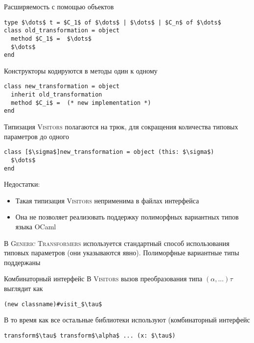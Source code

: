 \documentclass[
  russian,
  aspectratio=43,
  xcolor={svgnames},
  hyperref={colorlinks,citecolor=DeepPink4,linkcolor=DarkRed,urlcolor=DarkBlue}]{beamer}
\begin{document}
\begin{frame}[fragile]{Расширяемость с помощью объектов}
\begin{lstlisting}[style=ocaml1]
type $\dots$ t = $C_1$ of $\dots$ | $\dots$ | $C_n$ of $\dots$
class old_transformation = object 
  method $C_1$ =  $\dots$
  $\dots$
end
\end{lstlisting}
Конструкторы кодируются в методы один к одному
\begin{lstlisting}[style=ocaml1]
class new_transformation = object 
  inherit old_transformation
  method $C_i$ =  (* new implementation *)
end
\end{lstlisting}

\end{frame}

\begin{frame}[fragile]{Типизация}
\textsc{Visitors} полагаются на трюк, для сокращения количества типовых параметров до одного

\begin{lstlisting}[style=ocaml1]
class [$\sigma$]new_transformation = object (this: $\sigma$)
  $\dots$
end
\end{lstlisting}

Недостатки: 
\begin{itemize}
 \item Такая типизация \textsc{Visitors} неприменима в файлах интерфейса
 \item Она не позволяет реализовать поддержку полиморфных вариантных типов языка OCaml
\end{itemize}\vspace{1cm}

В \textsc{Generic Transformers} используется стандартный способ использования типовых параметров (они указываются явно). Полиморфные вариантные типы поддержаны
\end{frame}

\begin{frame}[fragile]{Комбинаторный интерфейс}
В \textsc{Visitors} вызов преобразования типа $(\alpha,...)\tau$ выглядит как 
\begin{lstlisting}[style=ocaml1]
(new classname)#visit_$\tau$
\end{lstlisting}\vspace{1cm}

В то время как все остальные библиотеки используют (комбинаторный интерфейс
\begin{lstlisting}[style=ocaml1]
transform$\tau$ transform$\alpha$ ... (x: $\tau$)
\end{lstlisting}%
\end{frame}
\end{document}
